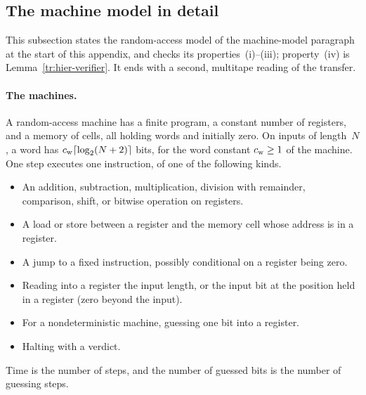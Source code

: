 \documentclass[11pt,letterpaper]{article}
\theoremstyle{definition}
\theoremstyle{remark}
\begin{document}
\subsection{The machine model in detail}
\label{tr:model-details}

This subsection states the random-access model of the machine-model
paragraph at the start of this appendix, and checks its
properties~(i)--(iii); property~(iv) is Lemma~\ref{tr:hier-verifier}.
It ends with a second, multitape reading of the transfer.

\paragraph{The machines.} A random-access machine has a finite program,
a constant number of registers, and a memory of cells, all holding
words and initially zero. On inputs of length~$N$, a word has
$c_{\rm w}\lceil\log_2(N+2)\rceil$ bits, for the word constant
$c_{\rm w}\ge1$ of the machine. One step executes one instruction, of
one of the following kinds.
\begin{itemize}
\item An addition, subtraction, multiplication, division with
remainder, comparison, shift, or bitwise operation on registers.
\item A load or store between a register and the memory cell whose
address is in a register.
\item A jump to a fixed instruction, possibly conditional on a register
being zero.
\item Reading into a register the input length, or the input bit at the
position held in a register (zero beyond the input).
\item For a nondeterministic machine, guessing one bit into a register.
\item Halting with a verdict.
\end{itemize}
Time is the number of steps, and the number of guessed bits is the
number of guessing steps.
\end{document}
